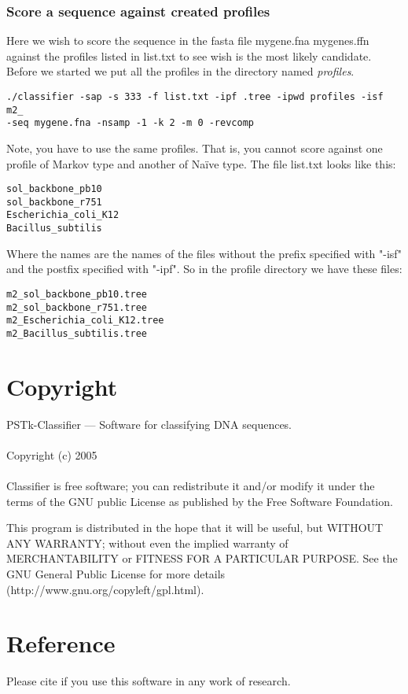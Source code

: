 \documentclass[]{article}
\begin{document}
\subsubsection{Score a sequence against created profiles}
Here we wish to score the sequence in the fasta file mygene.fna mygenes.ffn
against the profiles listed in list.txt to see wish is the most likely
candidate. Before we started we put all the profiles in the directory named
\textit{profiles}.
\begin{verbatim}
./classifier -sap -s 333 -f list.txt -ipf .tree -ipwd profiles -isf m2_
-seq mygene.fna -nsamp -1 -k 2 -m 0 -revcomp
\end{verbatim}
Note, you have to use the same profiles. That is, you cannot score against
one profile of Markov type and another of Na\"ive type. The file list.txt
looks like this:
\begin{verbatim}
sol_backbone_pb10
sol_backbone_r751
Escherichia_coli_K12
Bacillus_subtilis
\end{verbatim}
Where the names are the names of the files without the prefix specified with
"-isf" and the postfix specified with "-ipf". So in the profile directory
we have these files:
\begin{verbatim}
m2_sol_backbone_pb10.tree
m2_sol_backbone_r751.tree
m2_Escherichia_coli_K12.tree
m2_Bacillus_subtilis.tree
\end{verbatim}
 

\section{Copyright}
PSTk-Classifier --- Software for classifying DNA sequences.
\\\\ 
Copyright (c) 2005
\\\\
Classifier is free software; you can redistribute it and/or modify it
under the terms of the GNU public License as published by the Free
Software Foundation. 

This program is distributed in the hope that it will be useful, but
WITHOUT ANY WARRANTY; without even the implied warranty of MERCHANTABILITY
or FITNESS FOR A PARTICULAR PURPOSE. See the GNU General Public License
for more details (http://www.gnu.org/copyleft/gpl.html).

\section{Reference}
Please cite \cite{DalDub2006} if you use this software in any work of research.



\end{document}
